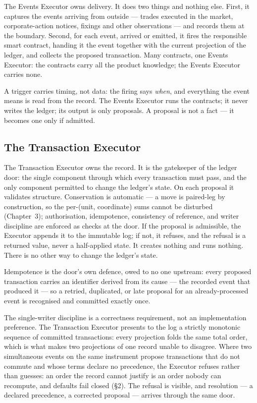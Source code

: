 The Events Executor owns delivery. It does two things and nothing else. First,
it captures the events arriving from outside --- trades executed in the market,
corporate-action notices, fixings and other observations --- and records them
at the boundary. Second, for each event, arrived or emitted, it fires the
responsible smart contract, handing it the event together with the current
projection of the ledger, and collects the proposed transaction. Many
contracts, one Events Executor: the contracts carry all the product knowledge;
the Events Executor carries none.

A trigger carries timing, not data: the firing says \emph{when}, and everything
the event means is read from the record. The Events Executor runs the
contracts; it never writes the ledger; its output is only proposals. A proposal
is not a fact --- it becomes one only if admitted.

\subsection{The Transaction Executor}

The Transaction Executor owns the record. It is the gatekeeper of the ledger
door: the single component through which every transaction must pass, and the
only component permitted to change the ledger's state. On each proposal it
validates structure. Conservation is automatic --- a move is paired-leg by
construction, so the per-(unit, coordinate) sums cannot be disturbed
(Chapter~3); authorisation, idempotence, consistency of reference, and writer
discipline are enforced as checks at the door. If the proposal is admissible,
the Executor appends it to the immutable log; if not, it refuses, and the
refusal is a returned value, never a half-applied state. It creates nothing and
runs nothing. There is no other way to change the ledger's state.

Idempotence is the door's own defence, owed to no one upstream: every proposed
transaction carries an identifier derived from its cause --- the recorded event
that produced it --- so a retried, duplicated, or late proposal for an
already-processed event is recognised and committed exactly once.

The single-writer discipline is a correctness requirement, not an
implementation preference. The Transaction Executor presents to the log a
strictly monotonic sequence of committed transactions: every projection folds
the same total order, which is what makes two projections of one record unable
to disagree. Where two simultaneous events on the same instrument propose
transactions that do not commute and whose terms declare no precedence, the
Executor refuses rather than guesses: an order the record cannot justify is an
order nobody can recompute, and defaults fail closed (\S2). The refusal is
visible, and resolution --- a declared precedence, a corrected proposal ---
arrives through the same door.

